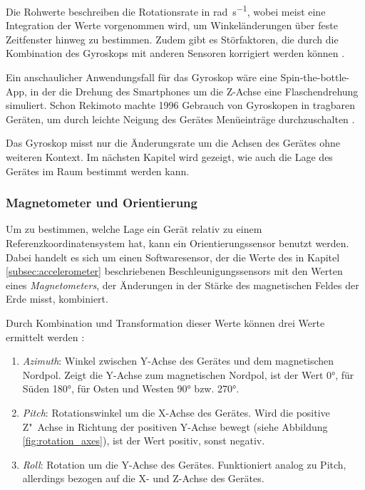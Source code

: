 Die Rohwerte beschreiben die Rotationsrate in \si{\radian\per\second}, wobei meist eine Integration der Werte vorgenommen wird, um Winkeländerungen über feste Zeitfenster hinweg zu bestimmen. Zudem gibt es Störfaktoren, die durch die Kombination des Gyroskops mit anderen Sensoren korrigiert werden können \citep{AndroidMotionSensors}. 

Ein anschaulicher Anwendungsfall für das Gyroskop wäre \zb eine Spin-the-bottle-App, in der die Drehung des Smartphones um die Z-Achse eine Flaschendrehung simuliert. Schon Rekimoto machte 1996 Gebrauch von Gyroskopen in tragbaren Geräten, um durch leichte Neigung des Gerätes Menüeinträge durchzuschalten \citep{Rekimoto1996}.

Das Gyroskop misst nur die Änderungsrate um die Achsen des Gerätes ohne weiteren Kontext. Im nächsten Kapitel wird gezeigt, wie auch die Lage des Gerätes im Raum bestimmt werden kann.

\subsubsection{Magnetometer und Orientierung}
Um zu bestimmen, welche Lage ein Gerät relativ zu einem Referenzkoordinatensystem hat, kann ein Orientierungssensor benutzt werden. Dabei handelt es sich um einen Softwaresensor, der die Werte des in Kapitel \ref{subsec:accelerometer} beschriebenen Beschleunigungssensors mit den Werten eines \textit{Magnetometers}, der Änderungen in der Stärke des magnetischen Feldes der Erde misst, kombiniert.

Durch Kombination und Transformation dieser Werte können drei Werte ermittelt werden \citep{AndroidPositionSensors}:
\begin{enumerate}
\item \textit{Azimuth}: Winkel zwischen Y-Achse des Gerätes und dem magnetischen Nordpol. Zeigt die Y-Achse zum magnetischen Nordpol, ist der Wert \ang{0}, für Süden \ang{180}, für Osten und Westen \ang{90} bzw. \ang{270}. 
\item \textit{Pitch}: Rotationswinkel um die X-Achse des Gerätes. Wird die positive Z"~Achse in Richtung der positiven Y-Achse bewegt (siehe Abbildung \ref{fig:rotation_axes}), ist der Wert positiv, sonst negativ.
\item \textit{Roll}: Rotation um die Y-Achse des Gerätes. Funktioniert analog zu Pitch, allerdings bezogen auf die X- und Z-Achse des Gerätes.
\end{enumerate}

